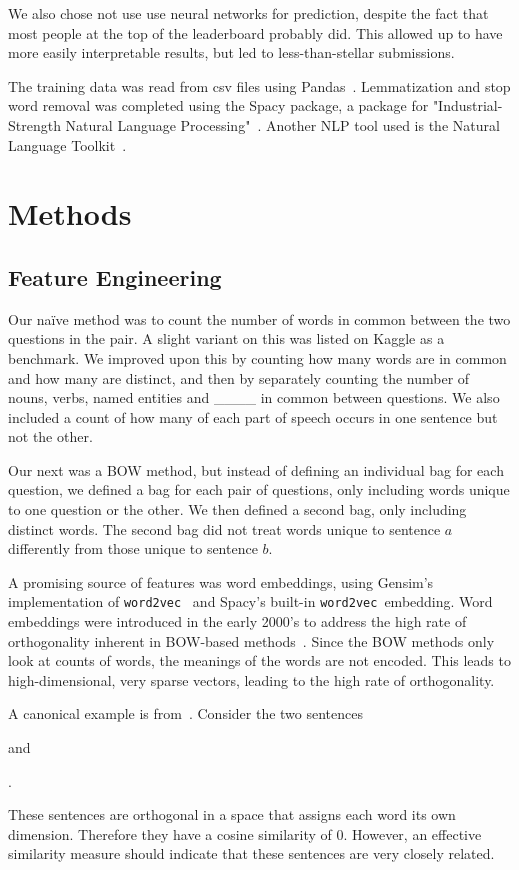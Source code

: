\documentclass{article} %
\newcommand{\wordtvec}{\texttt{word2vec}}
\begin{document}
We also chose not use use neural networks for prediction, despite the fact that most people at the top of the leaderboard probably did. This allowed up to have more easily interpretable results, but led to less-than-stellar submissions. 

The training data was read from csv files using Pandas~\cite{pandas}. Lemmatization and stop word removal was completed using the Spacy package, a package for "Industrial-Strength Natural Language Processing"~\cite{spacy}. Another NLP tool used is the Natural Language Toolkit~\cite{nltk}.

\section{Methods}

\subsection{Feature Engineering} \label{sub:features}

Our na\"ive method was to count the number of words in common between the two questions in the pair. A slight variant on this was listed on Kaggle as a benchmark. We improved upon this by counting how many words are in common and how many are distinct, and then by separately counting the number of nouns, verbs, named entities and \_\_\_\_ in common between questions. We also included a count of how many of each part of speech occurs in one sentence but not the other. 

Our next was a BOW method, but instead of defining an individual bag for each question, we defined a bag for each pair of questions, only including words unique to one question or the other. We then defined a second bag, only including distinct words. The second bag did not treat words unique to sentence $a$ differently from those unique to sentence $b$.

A promising source of features was word embeddings, using Gensim's implementation of \wordtvec~\cite{gensim} and Spacy's built-in \wordtvec\ embedding. Word embeddings were introduced in the early 2000's to address the high rate of orthogonality inherent in BOW-based methods~\cite{Bengio03}. Since the BOW methods only look at counts of words, the meanings of the words are not encoded. This leads to high-dimensional, very sparse vectors, leading to the high rate of orthogonality.

A canonical example is from~\cite{kusner15}. Consider the two sentences
\begin{center}
\end{center}
and 
\begin{center}
.
\end{center}
These sentences are orthogonal in a space that assigns each word its own dimension. Therefore they have a cosine similarity of 0. However, an effective similarity measure should indicate that these sentences are very closely related.
\end{document}

